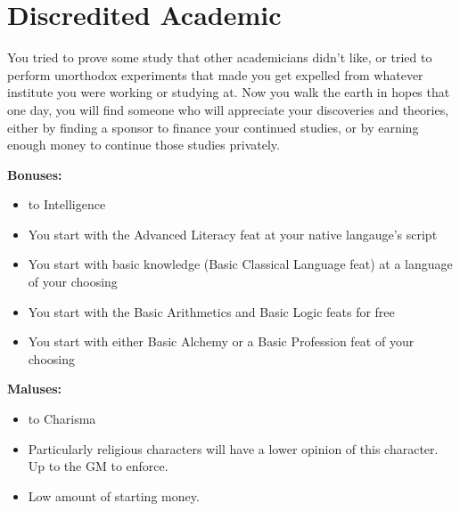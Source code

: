 \section{Discredited Academic}
You tried to prove some study that other academicians didn't like, or tried to perform unorthodox experiments that made you get expelled from whatever institute you were working or studying at. Now you walk the earth in hopes that one day, you will find someone who will appreciate your discoveries and theories, either by finding a sponsor to finance your continued studies, or by earning enough money to continue those studies privately.


\textbf{Bonuses:}
\begin{itemize}
	\item {} to Intelligence
	\item You start with the Advanced Literacy feat at your native langauge's script
	\item You start with basic knowledge (Basic Classical Language feat) at a language of your choosing
	\item You start with the Basic Arithmetics and Basic Logic feats for free
	\item You start with either Basic Alchemy or a Basic Profession feat of your choosing
\end{itemize}


\textbf{Maluses:}
\begin{itemize}
	\item {} to Charisma
	\item Particularly religious characters will have a lower opinion of this character. Up to the GM to enforce.
	\item Low amount of starting money.
\end{itemize}
